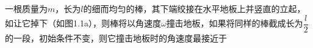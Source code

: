 一根质量为$m$，长为$l$的细而均匀的棒，其下端绞接在水平地板上并竖直的立起，如让它掉下（如图1.1a），则棒将以角速度$ω$撞击地板，如果将同样的棒截成长为$\dfrac{l}{2}$的一段，初始条件不变，则它撞击地板时的角速度最接近于
\option{2\omega}
{\omega}
{\omega}
{}
\begin{figure}[!h]
	\centering
	\quad
	\quad

\end{figure}
